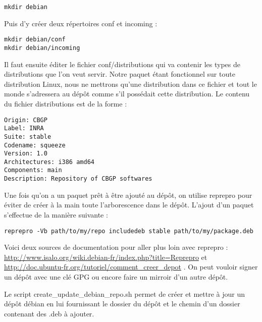\documentclass[12pt,a4paper]{article}
\begin{document}
        \begin{verbatim}mkdir debian \end{verbatim}

        Puis d'y créer deux répertoires conf et incoming :\\

        \begin{verbatim}mkdir debian/conf
mkdir debian/incoming \end{verbatim}

        Il faut ensuite éditer le fichier conf/distributions qui va contenir les
        types de distributions que l'on veut servir. Notre paquet étant
        fonctionnel sur toute distribution Linux, nous ne mettrons qu'une
        distribution dans ce fichier et tout le monde s'adressera au dépôt comme
        s'il possédait cette distribution. Le contenu du fichier distributions
        est de la forme : \\

        \begin{verbatim}Origin: CBGP
Label: INRA
Suite: stable
Codename: squeeze
Version: 1.0
Architectures: i386 amd64
Components: main
Description: Repository of CBGP softwares \end{verbatim}

        Une fois qu'on a un paquet prêt à être ajouté au dépôt, on utilise
        reprepro pour éviter de créer à la main toute l'arborescence dans le
        dépôt. L'ajout d'un paquet s'effectue de la manière suivante :\\

        \begin{verbatim}reprepro -Vb path/to/my/repo includedeb stable path/to/my/package.deb \end{verbatim}

        Voici deux sources de documentation pour aller plus loin avec reprepro
        :\newline
        \url{http://www.isalo.org/wiki.debian-fr/index.php?title=Reprepro}
        et\newline
        \url{http://doc.ubuntu-fr.org/tutoriel/comment_creer_depot} . On peut
        vouloir signer un dépôt avec une clé GPG ou encore faire un mirroir d'un
        autre dépôt.

        Le script create\_update\_debian\_repo.sh permet de créer et mettre à
        jour un dépôt débian en lui fournissant le dossier du dépôt et le chemin
        d'un dossier contenant des .deb à ajouter.
\end{document}
